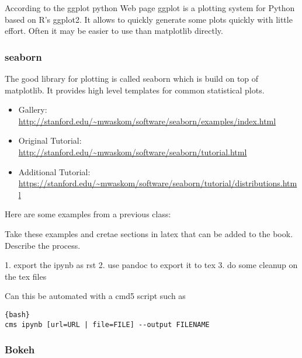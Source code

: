 

According to the ggplot python Web page ggplot is a plotting system for
Python based on R's ggplot2. It allows to quickly generate some plots
quickly with little effort. Often it may be easier to use than
matplotlib directly.

\subsubsection{seaborn}\label{seaborn}


The good library for plotting is called seaborn which is build on top of
matplotlib. It provides high level templates for common statistical
plots.

\begin{itemize}
\item
  Gallery:
  \url{http://stanford.edu/~mwaskom/software/seaborn/examples/index.html}
\item
  Original Tutorial:
  \url{http://stanford.edu/~mwaskom/software/seaborn/tutorial.html}
\item
  Additional Tutorial:
  \url{https://stanford.edu/~mwaskom/software/seaborn/tutorial/distributions.html}
\end{itemize}

Here are some examples from a previous class:


\begin{exercise}\label{E:ipynb-export}
Take these examples and cretae sections in latex that can be added to
the book. Describe the process. 

1. export the ipynb as rst
2. use pandoc to export it to tex
3. do some cleanup on the tex files

Can this be automated with a cmd5 script such as
\begin{lstlisting}{bash}
cms ipynb [url=URL | file=FILE] --output FILENAME
\end{lstlisting}
\end{exercise}

\subsubsection{Bokeh}\label{bokeh}

